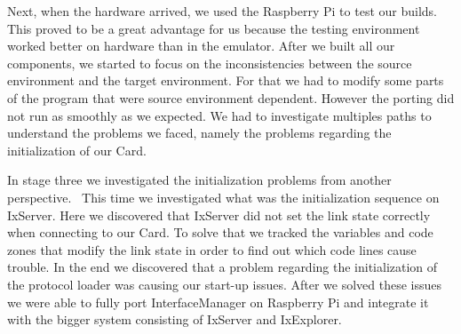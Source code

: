 Next, when the hardware arrived, we used the Raspberry Pi to test our builds.
This proved to be a great advantage for us because the testing environment
worked better on hardware than in the emulator. After we built all our
components, we started to focus on the inconsistencies between the source
environment and the target environment. For that we had to modify some parts of
the program that were source environment dependent. However the porting did not
run as smoothly as we expected. We had to investigate multiples paths to
understand the problems we faced, namely the problems regarding the
initialization of our Card.~

In stage three we investigated the initialization problems from another
perspective.~ This time we investigated what was the initialization sequence on
IxServer. Here we discovered that IxServer did not set the link state correctly
when connecting to our Card. To solve that we tracked the variables and code
zones that modify the link state in order to find out which code lines cause
trouble. In the end we discovered that a problem regarding the initialization
of the protocol loader was causing our start-up issues. After we solved
these issues we were able to fully port InterfaceManager on Raspberry Pi and
integrate it with the bigger system consisting of IxServer and IxExplorer.
